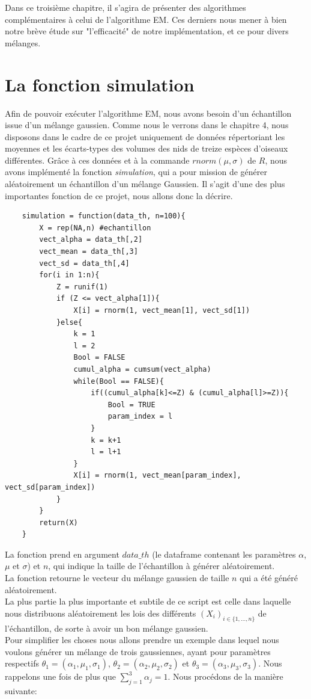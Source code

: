 \documentclass[frenchb]{report}
\newcommand{\1}{\mathbbm{1}}
\theoremstyle{definition}\newtheorem{defn}{Définition}
\theoremstyle{definition}\newtheorem{exm}{Exemple}
\theoremstyle{definition}\newtheorem{nota}{Notation}
\theoremstyle{definition}\newtheorem{rem}{Remarque}
\begin{document}
Dans ce troisième chapitre, il s'agira de présenter des algorithmes complémentaires à celui de l'algorithme EM. Ces derniers nous mener à bien notre brève étude sur "l'efficacité" de notre implémentation, et ce pour divers mélanges.

\section{La fonction simulation}
Afin de pouvoir exécuter l'algorithme EM, nous avons besoin d'un échantillon issue d'un mélange gaussien. Comme nous le verrons dans le chapitre 4, nous disposons dans le cadre de ce projet uniquement de données répertoriant les moyennes et les écarts-types des volumes des nids de treize espèces d'oiseaux différentes. Grâce à ces données et à la commande $rnorm(\mu, \sigma)$ de $R$, nous avons implémenté la fonction \textit{simulation}, qui a pour mission de générer aléatoirement un échantillon d'un mélange Gaussien. Il s'agit d'une des plus importantes fonction de ce projet, nous allons donc la décrire.
\begin{lstlisting}
	simulation = function(data_th, n=100){
		X = rep(NA,n) #echantillon
		vect_alpha = data_th[,2]
		vect_mean = data_th[,3]
		vect_sd = data_th[,4]
		for(i in 1:n){
			Z = runif(1)
			if (Z <= vect_alpha[1]){
				X[i] = rnorm(1, vect_mean[1], vect_sd[1])
			}else{
				k = 1
				l = 2
				Bool = FALSE
				cumul_alpha = cumsum(vect_alpha)
				while(Bool == FALSE){
					if((cumul_alpha[k]<=Z) & (cumul_alpha[l]>=Z)){
						Bool = TRUE
						param_index = l
					}
					k = k+1
					l = l+1
				}
				X[i] = rnorm(1, vect_mean[param_index], vect_sd[param_index])
			}
		}
		return(X)
	}
\end{lstlisting}
\newpage
La fonction prend en argument $data\_th$ (le dataframe contenant les paramètres $\alpha$, $\mu$ et $\sigma$) et $n$, qui indique la taille de l'échantillon à générer aléatoirement. \\
La fonction retourne le vecteur du mélange gaussien de taille $n$ qui a été généré aléatoirement. \\
La plus partie la plus importante et subtile de ce script est celle dans laquelle nous distribuons aléatoirement les lois des différents $(X_i)_{i \in \{1, \dots, n\}}$ de l'échantillon, de sorte à avoir un bon mélange gaussien. \\
Pour simplifier les choses nous allons prendre un exemple dans lequel nous voulons générer un mélange de trois gaussiennes, ayant pour paramètres respectifs $\theta_1 = (\alpha_1, \mu_1, \sigma_1)$, $\theta_2 = (\alpha_2, \mu_2, \sigma_2)$ et $\theta_3 = (\alpha_3, \mu_3, \sigma_3)$. Nous rappelons une fois de plus que  $\displaystyle\sum_{j=1}^{3} \alpha_j = 1$. Nous procédons de la manière suivante: \\
\end{document}
